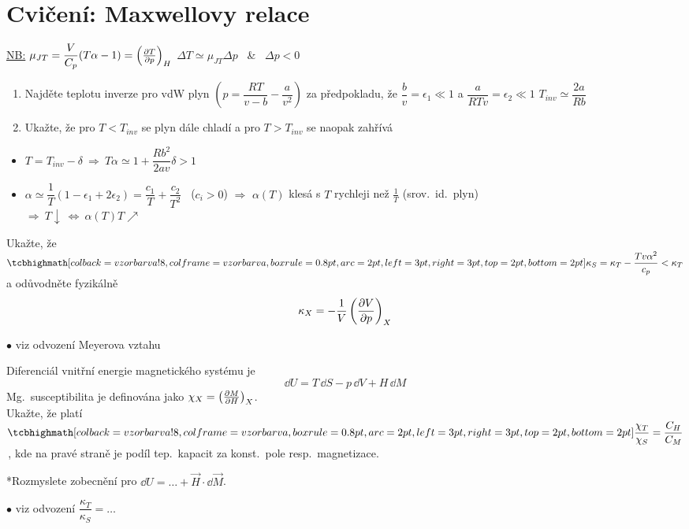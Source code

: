 \section{Cvičení: Maxwellovy relace}

\begin{priklad}
\underline{NB:} \quad $\mu_{JT} = \dfrac{V}{C_p}(T\alpha - 1) = \left(\pdv{T}{p}\right)_H$ \qquad $\Delta T \simeq \mu_{JT}\Delta p$ \ \& \ $\Delta p < 0$
\begin{enumerate}[label=\alph*)]
  \item Najděte teplotu inverze pro vdW plyn $\left(p = \dfrac{RT}{v - b} - \dfrac{a}{v^2}\right)$ za předpokladu, že $\dfrac{b}{v} = \epsilon_1 \ll 1$ a $\dfrac{a}{RTv} = \epsilon_2 \ll 1$
  \hfill \textcolor{NavyBlue}{$T_{inv} \simeq \dfrac{2a}{Rb}$}
  \item Ukažte, že pro $T < T_{inv}$ se plyn dále chladí a pro $T > T_{inv}$ se naopak zahřívá
\end{enumerate}
\end{priklad}
\begin{itemize}\color{NavyBlue}
  \item $T = T_{inv} - \delta \ \Rightarrow\ T\alpha \simeq 1 + \dfrac{Rb^2}{2av}\delta > 1$
  \item $\alpha \simeq \dfrac1T(1 - \epsilon_1 + 2\epsilon_2) = \dfrac{c_1}{T} + \dfrac{c_2}{T^2}$ \ ($c_i > 0$) $\Rightarrow$ $\alpha(T)$ klesá s $T$ rychleji než $\frac1T$ (srov.\ id.\ plyn) \\
  $\Rightarrow\ T\downarrow\ \Leftrightarrow\ \alpha(T)T\nearrow$
\end{itemize}

\begin{priklad}[Příklad 2]
Ukažte, že \quad $\vzorec{\kappa_S = \kappa_T - \dfrac{Tv\alpha^2}{c_p}} < \kappa_T$ \quad a odůvodněte fyzikálně
\[ \kappa_X = -\frac1V\left(\pdv{V}{p}\right)_X \]
\end{priklad}
\textcolor{NavyBlue}{$\bullet$ viz odvození Meyerova vztahu}

\begin{priklad}[Příklad 3]
Diferenciál vnitřní energie magnetického systému je
\[ \dd U = T\,\dd S - p\,\dd V + H\,\dd M \]
Mg.\ susceptibilita je definována jako $\chi_X = \left(\pdv{M}{H}\right)_X$. \\
Ukažte, že platí \quad $\vzorec{\dfrac{\chi_T}{\chi_S} = \dfrac{C_H}{C_M}}$\,, kde na pravé straně je podíl tep.\ kapacit za konst.\ pole resp.\ magnetizace.

*Rozmyslete zobecnění pro $\dd U = \dots + \vec H\cdot\dd\vec M$.
\end{priklad}
\textcolor{NavyBlue}{$\bullet$ viz odvození $\dfrac{\kappa_T}{\kappa_S} = \dots$}

